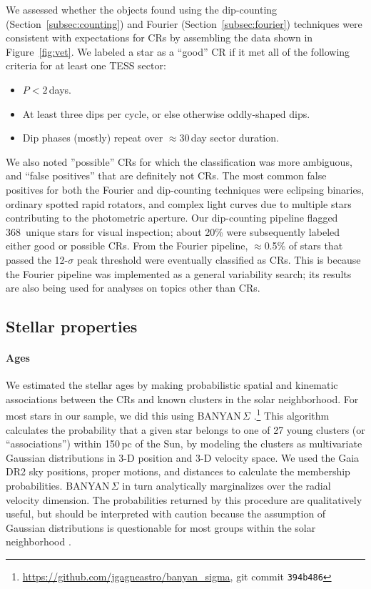 \documentclass[11pt,twocolumn,tighten]{aastex63}
\newcommand{\nuniqdipflagged}{{368}} %
\begin{document}
We assessed whether the objects found using the dip-counting
(Section~\ref{subsec:counting}) and Fourier
(Section~\ref{subsec:fourier}) techniques were consistent with
expectations for CRs by assembling the data shown in
Figure~\ref{fig:vet}.  We labeled a star as a ``good'' CR if it met
all of the following criteria for at least one TESS sector:
\vspace{-2pt}
\begin{itemize}[leftmargin=*]
  \setlength\itemsep{-2pt}
  \item $P<2$\,days.
  \item At least three dips per cycle, or else otherwise
    oddly-shaped dips.
  \item Dip phases (mostly) repeat over $\approx$30\,day sector duration.
\end{itemize}
\vspace{-2pt}
We also noted ''possible'' CRs for which the classification was more
ambiguous, and ``false positives'' that are definitely not CRs.  The
most common false positives for both the Fourier and dip-counting
techniques were eclipsing binaries, ordinary spotted rapid rotators,
and complex light curves due to multiple stars contributing to the
photometric aperture.  Our dip-counting pipeline flagged
\nuniqdipflagged\ unique stars for visual inspection; about 20\% were
subsequently labeled either good or possible CRs.  From the Fourier
pipeline, $\approx$0.5\% of stars that passed the 12-$\sigma$ peak
threshold were eventually classified as CRs.  This is because the
Fourier pipeline was implemented as a general variability search; its
results are also being used for analyses on topics other than CRs.



\subsection{Stellar properties}
\label{subsec:starprops}

\paragraph{Ages}
We estimated the stellar ages by making probabilistic spatial and
kinematic associations between the CRs and known clusters in the solar
neighborhood.  For most stars in our sample, we did this using
BANYAN\,$\Sigma$
\citep{2018ApJ...856...23G}.\footnote{\url{https://github.com/jgagneastro/banyan_sigma},
git commit \texttt{394b486}} This algorithm calculates the probability
that a given star belongs to one of 27 young clusters (or
``associations'') within 150\,pc of the Sun, by modeling the clusters
as multivariate Gaussian distributions in 3-D position and 3-D
velocity space.  We used the Gaia DR2 sky positions, proper motions,
and distances to calculate the membership probabilities.
BANYAN\,$\Sigma$ in turn analytically marginalizes over the radial
velocity dimension.  The probabilities returned by this procedure are
qualitatively useful, but should be interpreted with caution because
the assumption of Gaussian distributions is questionable for most
groups within the solar neighborhood \citep[see
e.g.][Figure~10]{2021ApJ...917...23K}.
\end{document}

